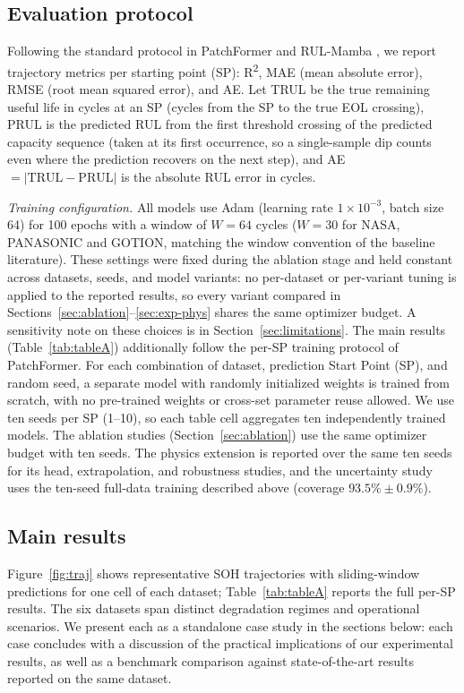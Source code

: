 \documentclass[final,5p,times,twocolumn]{elsarticle}
\begin{document}
\subsection{Evaluation protocol}
\label{sec:protocol}

Following the standard protocol in PatchFormer \cite{ref_patchformer}
and RUL-Mamba \cite{ref_rulmamba}, we report trajectory
metrics per starting point (SP): R\textsuperscript{2}, MAE (mean absolute error),
RMSE (root mean squared error), and AE. Let TRUL be the true
remaining useful life in cycles at an SP (cycles from the SP to the
true EOL crossing), PRUL is the predicted RUL from the first threshold
crossing of the predicted capacity sequence (taken at its first occurrence, so
a single-sample dip counts even where the prediction recovers on the next
step), and AE $= |\text{TRUL} - \text{PRUL}|$ is the absolute RUL error in
cycles.

\emph{Training configuration.} All models use Adam (learning rate
$1\times10^{-3}$, batch size 64) for 100 epochs with a window of
$W{=}64$ cycles ($W{=}30$ for NASA, PANASONIC and GOTION, matching the
window convention of the baseline literature). These settings were
fixed during the ablation stage and held constant across datasets,
seeds, and model variants: no per-dataset or per-variant tuning is
applied to the reported results, so every variant compared in
Sections~\ref{sec:ablation}--\ref{sec:exp-phys} shares the same optimizer
budget. A sensitivity note on these choices is in
Section~\ref{sec:limitations}.
The main results (Table~\ref{tab:tableA}) additionally follow the
per-SP training protocol of PatchFormer. For each combination of dataset, prediction Start Point (SP), 
and random seed, a separate model with randomly initialized weights is trained from scratch, 
with no pre-trained weights or cross-set parameter reuse allowed. We use ten seeds per
SP (1--10), so each table cell aggregates ten independently trained
models. The ablation studies (Section~\ref{sec:ablation}) use the
same optimizer budget with ten seeds. The physics extension is
reported over the same ten seeds for its head, extrapolation, and
robustness studies, and the uncertainty study uses the ten-seed
full-data training described above (coverage
$93.5\%\pm0.9\%$).

\subsection{Main results}
\label{sec:main}

Figure~\ref{fig:traj} shows representative SOH trajectories with
sliding-window predictions for one cell of each dataset;
Table~\ref{tab:tableA} reports the full per-SP results. The six datasets span distinct degradation regimes 
and operational scenarios. We present each as a standalone case study in the sections below: 
each case concludes with a discussion of the practical implications of our experimental results, 
as well as a benchmark comparison against state-of-the-art results reported on the same dataset.
\end{document}
